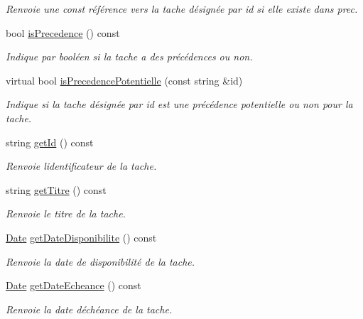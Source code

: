 \begin{DoxyCompactItemize}
\begin{DoxyCompactList}\small\item\em Renvoie une const référence vers la tache désignée par id si elle existe dans prec. \end{DoxyCompactList}\item 
bool \hyperlink{class_tache_a72df18190512de6ca437492a3664d05a}{is\+Precedence} () const 
\begin{DoxyCompactList}\small\item\em Indique par booléen si la tache a des précédences ou non. \end{DoxyCompactList}\item 
virtual bool \hyperlink{class_tache_ae873dc0bfe552ea39c34f430d56f3846}{is\+Precedence\+Potentielle} (const string \&id)
\begin{DoxyCompactList}\small\item\em Indique si la tache désignée par id est une précédence potentielle ou non pour la tache. \end{DoxyCompactList}\item 
string \hyperlink{class_tache_a1fe8754733f0b85c232d91851cf61891}{get\+Id} () const 
\begin{DoxyCompactList}\small\item\em Renvoie l\textquotesingle{}identificateur de la tache. \end{DoxyCompactList}\item 
string \hyperlink{class_tache_ab6af5354e29498ab43ab3cc826b0aac4}{get\+Titre} () const 
\begin{DoxyCompactList}\small\item\em Renvoie le titre de la tache. \end{DoxyCompactList}\item 
\hyperlink{class_t_i_m_e_1_1_date}{Date} \hyperlink{class_tache_a8cba5e74f4ee6b31e29d0339dbe470fe}{get\+Date\+Disponibilite} () const 
\begin{DoxyCompactList}\small\item\em Renvoie la date de disponibilité de la tache. \end{DoxyCompactList}\item 
\hyperlink{class_t_i_m_e_1_1_date}{Date} \hyperlink{class_tache_abe0dbe94fc6908ba5e3cb7fd2fa90f92}{get\+Date\+Echeance} () const 
\begin{DoxyCompactList}\small\item\em Renvoie la date d\textquotesingle{}échéance de la tache. \end{DoxyCompactList}\item 

\end{DoxyCompactItemize}

